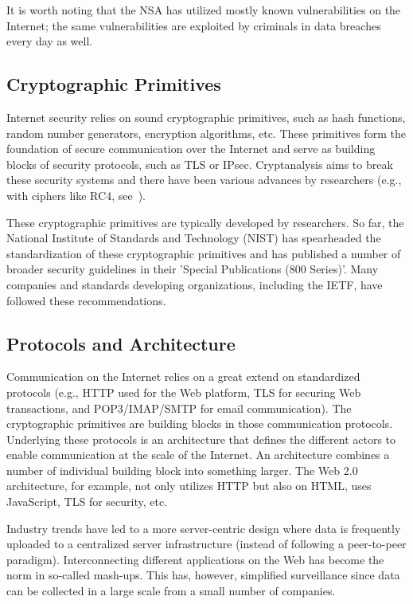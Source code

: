 \documentclass[peerreview, a4paper, 7pt]{IEEEtran}
\begin{document}
It is worth noting that the NSA has utilized mostly known vulnerabilities on the Internet; the same vulnerabilities are exploited by criminals in data breaches every day as well. 

\subsection{Cryptographic Primitives}

Internet security relies on sound cryptographic primitives, such as hash functions, random number generators, encryption algorithms, etc. These primitives form the foundation of secure communication over the Internet and serve as building blocks of security protocols, such as TLS or IPsec. Cryptanalysis aims to break these security systems and there have been various advances by researchers (e.g., with ciphers like RC4, see~\cite{RC4, RC4-TLS}).

These cryptographic primitives are typically developed by researchers. So far, the National Institute of Standards and Technology (NIST) has spearheaded the standardization of these cryptographic primitives and has published a number of broader security guidelines in their 'Special Publications (800 Series)'. Many companies and standards developing organizations, including the IETF, have followed these recommendations.

\subsection{Protocols and Architecture}

Communication on the Internet relies on a great extend on standardized protocols (e.g., HTTP used for the Web platform, TLS for securing Web transactions, and POP3/IMAP/SMTP for email communication). The cryptographic primitives are building blocks in those communication protocols. Underlying these protocols is an architecture that defines the different actors to enable communication at the scale of the Internet. An architecture combines a number of individual building block into something larger. The Web 2.0 architecture, for example, not only utilizes HTTP but also on HTML, uses JavaScript, TLS for security, etc. 

Industry trends have led to a more server-centric design where data is frequently uploaded to a centralized server infrastructure (instead of following a peer-to-peer paradigm). Interconnecting different applications on the Web has become the norm in so-called mash-ups. This has, however, simplified surveillance since data can be collected in a large scale from a small number of companies. 
\end{document}
